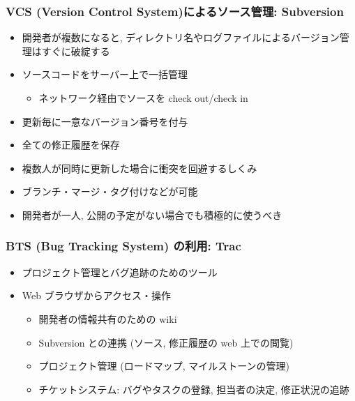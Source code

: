 \begin{frame}
  \frametitle{VCS (Version Control System)によるソース管理: Subversion}
  \begin{itemize}
  \item 開発者が複数になると, ディレクトリ名やログファイルによるバージョン管理はすぐに破綻する
  \item ソースコードをサーバー上で一括管理
    \begin{itemize}
    \item ネットワーク経由でソースを check out/check in
    \end{itemize}
  \item 更新毎に一意なバージョン番号を付与
  \item 全ての修正履歴を保存
  \item 複数人が同時に更新した場合に衝突を回避するしくみ
  \item ブランチ・マージ・タグ付けなどが可能
  \item 開発者が一人, 公開の予定がない場合でも積極的に使うべき
  \end{itemize}
\end{frame}

\begin{frame}
  \frametitle{BTS (Bug Tracking System) の利用: Trac}
  \begin{itemize}
    \setlength{\itemsep}{1em}
  \item プロジェクト管理とバグ追跡のためのツール
  \item Web ブラウザからアクセス・操作
    \begin{itemize}
    \item 開発者の情報共有のための wiki
    \item Subversion との連携 (ソース, 修正履歴の web 上での閲覧)
    \item プロジェクト管理 (ロードマップ, マイルストーンの管理)
    \item チケットシステム: バグやタスクの登録, 担当者の決定, 修正状況の追跡
    \end{itemize}
  \end{itemize}
\end{frame}

